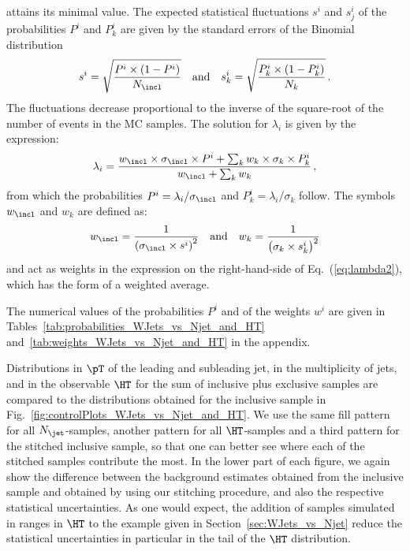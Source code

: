 attains its minimal value.
The expected statistical fluctuations $s^{i}$ and $s_{j}^{i}$ of the probabilities $P^{i}$ and $P_{k}^{i}$
are given by the standard errors of the Binomial distribution~\cite{Cowan:1998ji}
\begin{equation*}
s^{i} = \sqrt{\frac{P^{i} \times (1 - P^{i})}{N_{\incl}}} \quad \mbox{and} \quad s_{k}^{i} = \sqrt{\frac{P_{k}^{i} \times (1 - P_{k}^{i})}{N_{k}}} \, .
\end{equation*}
The fluctuations decrease proportional to the inverse of the square-root of the number of events in the MC samples.
The solution for $\lambda_{i}$ is given by the expression:
\begin{equation}
\lambda_{i} = \frac{w_{\incl} \times \sigma_{\incl} \times P^{i} + \sum_{k} w_{k} \times \sigma_{k} \times P_{k}^{i}}{w_{\incl} + \sum_{k} w_{k}} \, ,
\label{eq:lambda2}
\end{equation}
from which the probabilities $P^{i} = \lambda_{i}/\sigma_{\incl}$ and $P_{k}^{i} = \lambda_{i}/\sigma_{k}$ follow.
The symbols $w_{\incl}$ and $w_{k}$ are defined as:
\begin{equation*}
w_{\incl} = \frac{1}{\left( \sigma_{\incl} \times s^{i} \right)^{2}} \quad \mbox{and} \quad w_{k} = \frac{1}{\left( \sigma_{k} \times s_{k}^{i} \right)^{2}}
\end{equation*}
and act as weights in the expression on the right-hand-side of Eq.~(\ref{eq:lambda2}),
which has the form of a weighted average.

The numerical values of the probabilities $P^{i}$ and of the weights $w^{i}$ are given in Tables~\ref{tab:probabilities_WJets_vs_Njet_and_HT}
and~\ref{tab:weights_WJets_vs_Njet_and_HT} in the appendix.

Distributions in $\pT$ of the leading and subleading jet,
in the multiplicity of jets, and in the observable $\HT$ 
for the sum of inclusive plus exclusive samples are compared to the distributions obtained for the inclusive sample in Fig.~\ref{fig:controlPlots_WJets_vs_Njet_and_HT}.
We use the same fill pattern for all $N_{\jet}$-samples, another pattern for all $\HT$-samples and a third pattern for the stitched inclusive sample,
so that one can better see where each of the stitched samples contribute the most.
In the lower part of each figure, we again show the difference between the background estimates obtained from the inclusive sample and obtained by using our stitching procedure,
and also the respective statistical uncertainties.
As one would expect, the addition of samples simulated in ranges in $\HT$ to the example given in Section~\ref{sec:WJets_vs_Njet}
reduce the statistical uncertainties in particular in the tail of the $\HT$ distribution.

